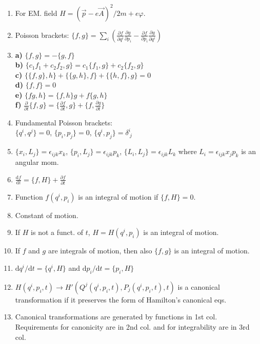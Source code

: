 \documentclass{article}
\renewcommand\d{\mathrm d}
\begin{document}
\begin{multicols}{3}
\begin{enumerate}
            \item For EM. field $H=(\vec p-e\vec A)^2/2m+e\varphi$.
            \item Poisson brackets: $\{f,g\}=\sum_i\left(\frac{\partial f}{\partial q^i}\frac{\partial g}{\partial p_i}-\frac{\partial f}{\partial p_i}\frac{\partial g}{\partial q^i}\right)$
            \item \textbf{a)} $\{f,g\}=-\{g,f\}$\\
                \textbf{b)} $\{c_1f_1+c_2f_2,g\}=c_1\{f_1,g\}+c_2\{f_2,g\}$\\
                \textbf{c)} $\{\{f,g\},h\}+\{\{g,h\},f\}+\{\{h,f\},g\}=0$\\
                \textbf{d)} $\{f,f\}=0$\\
                \textbf{e)} $\{fg,h\}=\{f,h\}g+f\{g,h\}$\\
                \textbf{f)} $\frac{\partial}{\partial t}\{f,g\}=\{\frac{\partial f}{\partial t},g\}+\{f,\frac{\partial g}{\partial t}\}$\\
            \item Fundamental Poisson brackets:\\$\{q^i,q^j\}=0$, $\{p_i,p_j\}=0$, $\{q^i,p_j\}=\delta^i_{~j}$
            \item $\{x_i,L_j\}=\epsilon_{ijk}x_k$, $\{p_i,L_j\}=\epsilon_{ijk}p_k$, $\{L_i,L_j\}=\epsilon_{ijk}L_k$ where $L_i=\epsilon_{ijk}x_jp_k$ is an angular mom.
            \item $\frac{\d f}{\d t}=\{f,H\}+\frac{\partial f}{\partial t}$
            \item Function $f(q^i,p_i)$ is an integral of motion if $\{f,H\}=0$.
		\item {\color{red} Constant of motion.}
            \item If $H$ is not a funct. of $t$, $H=H(q^i,p_i)$ is an integral of motion.
            \item If $f$ and $g$ are integrals of motion, then also $\{f,g\}$ is an integral of motion.
            \item $\d q^i/\d t=\{q^i,H\}$ and $\d p_i/\d t=\{p_i,H\}$
            \item $H(q^i,p_i,t)\to H'(Q^j(q^i,p_i,t),P_j(q^i,p_i,t),t)$ is a canonical transformation if it preserves the form of Hamilton's canonical eqs.
            \item Canonical transformations are generated by functions in 1st col. Requirements for canonicity are in 2nd col. and for integrability are in 3rd col.
            \begin{tabular}{|c|c|c|}

\end{tabular}
\end{enumerate}
\end{multicols}
\end{document}
